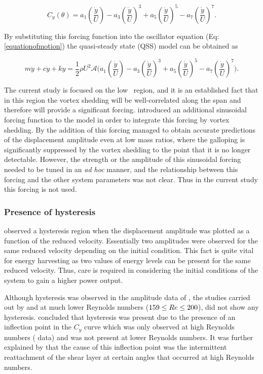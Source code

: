 \begin{equation}
\label{cy ploynomial}
C_y(\theta)=a_1\left(\frac{\dot{y}}{U}\right)-a_3\left(\frac{\dot{y}}{U}\right)^3+a_5\left(\frac{\dot{y}}{U}\right)^5-a_7\left(\frac{\dot{y}}{U}\right)^7.
\end{equation}

By substituting this forcing function into the oscillator equation (Eq:\ref{equationofmotion}) the quasi-steady state (QSS) model can be obtained as

\begin{equation}
\label{final_equation_motion}
m\ddot{y}{+}c\dot{y}{+}ky{=}\frac{1}{2}\rho U^2 \mathcal {A} \Bigg(a_1\left(\frac{\dot{y}}{U}\right){-}a_3\left(\frac{\dot{y}}{U}\right)^3{+}a_5\left(\frac{\dot{y}}{U}\right)^5{-}a_7\left(\frac{\dot{y}}{U}\right)^7 \Bigg).
\end{equation}

The current study is focused on the low \reynoldsnumber\ region, and it is an established fact that in this region the vortex shedding will be well-correlated along the span and therefore will provide a significant forcing. \citet{Joly2012} introduced an additional sinusoidal forcing function to the model in order to integrate this forcing by vortex shedding. By the addition of this forcing \citet{Joly2012} managed to obtain accurate predictions of the displacement amplitude even at low mass ratios, where the galloping is significantly suppressed by the vortex shedding to the point that it is no longer detectable. However, the strength or the amplitude of this sinusoidal forcing needed to be tuned in an \emph{ad hoc} manner, and the relationship between this forcing and the other system parameters was not clear. Thus in the current study this forcing is not used.

\subsubsection*{Presence of hysteresis}

\cite{Parkinson1964} observed a hysteresis region when the displacement amplitude was plotted as a function of the reduced velocity. Essentially two amplitudes were observed for the same reduced velocity depending on the initial condition. This fact is quite vital for energy harvesting as two values of energy levels can be present for the same reduced velocity. Thus, care is required in considering the initial conditions of the system to gain a higher power output.  

Although hysteresis was observed in the amplitude data of \cite{Parkinson1964}, the studies carried out by \citet{Barrero-Gil2009} and \citet{Joly2012} at much lower Reynolds numbers ($159\leq Re\leq 200$), did not show any hysteresis. \citet{Luo2003} concluded that hysteresis was present due to the presence of an inflection point in the $C_y$ curve which was only observed at high Reynolds numbers (\citet{Parkinson1964} data) and was not present at lower Reynolds numbers. It was further explained by \citet{Luo2003} that the cause of this inflection point was the intermittent reattachment of the shear layer at certain angles that occurred at high Reynolds numbers.   
 
